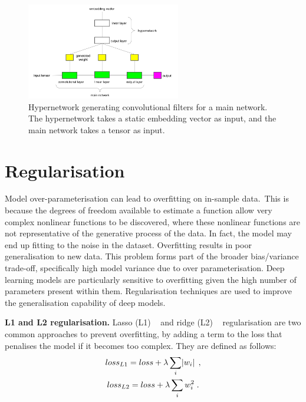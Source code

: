 \begin{figure}
   	\centering
    	\includegraphics[width=0.6\textwidth, height=0.4\textwidth]{hypernetwork.png}
	\caption{Hypernetwork generating convolutional filters for a main network. The hypernetwork takes a static embedding vector as input, and the main network takes a tensor as input.}
\end{figure}



\section{Regularisation}

Model over-parameterisation can lead to overfitting on in-sample data.\ This is because the degrees of freedom available to estimate a function allow very complex nonlinear functions to be discovered, where these nonlinear functions are not representative of the generative process of the data. In fact, the model may end up fitting to the noise in the dataset. Overfitting results in poor generalisation to new data. This problem forms part of the broader bias/variance trade-off, specifically high model variance due to over parameterisation. Deep learning models are particularly sensitive to overfitting given the high number of parameters present within them. Regularisation techniques are used to improve the generalisation capability of deep models. \par

\noindent \textbf{L1 and L2 regularisation.} Lasso (L1) \unskip ~\citep{tibshirani1996regression} and ridge (L2) \unskip ~\citep{hoerl1970ridge} regularisation are two common approaches to prevent overfitting, by adding a term to the loss that penalises the model if it becomes too complex. They are defined as follows:
\begin{subequations}
	\begin{gather}
		loss_{L1} = loss + \lambda\sum_i\abs{w_i} \; ,  \\
		loss_{L2} = loss + \lambda\sum_iw_i^2 \; .
	\end{gather}
\end{subequations}

